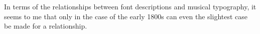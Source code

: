 \documentclass[10pt]{newlfm}
\begin{document}
\begin{newlfm}
In terms of the relationships between font descriptions and musical
typography, it seems to me that only in the case of the early 1800s can even
the slightest case be made for a relationship.  
\end{newlfm}
\end{document}
